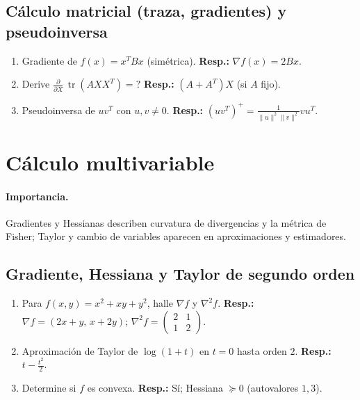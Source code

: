 	\subsection*{Cálculo matricial (traza, gradientes) y pseudoinversa}
	\begin{enumerate}
		\item Gradiente de $f(x)=x^TBx$ (simétrica). \textbf{Resp.:} $\nabla f(x)=2Bx$.
		\item Derive $\frac{\partial}{\partial X}\, \operatorname{tr}(AXX^T)=?$ \textbf{Resp.:} $(A+A^T)X$ (si $A$ fijo).
		\item Pseudoinversa de $u v^T$ con $u,v\ne0$. \textbf{Resp.:} $(uv^T)^+=\frac{1}{\|u\|^2\|v\|^2}vu^T$.
	\end{enumerate}
	
	\section{Cálculo multivariable}
	\paragraph{Importancia.} Gradientes y Hessianas describen curvatura de divergencias y la métrica de Fisher; Taylor y cambio de variables aparecen en aproximaciones y estimadores.
	
	\subsection*{Gradiente, Hessiana y Taylor de segundo orden}
	\begin{enumerate}
		\item Para $f(x,y)=x^2+xy+y^2$, halle $\nabla f$ y $\nabla^2 f$. \textbf{Resp.:} $\nabla f=(2x+y,\,x+2y)$; $\nabla^2 f=\begin{pmatrix}2&1\\1&2\end{pmatrix}$.
		\item Aproximación de Taylor de $\log(1+t)$ en $t=0$ hasta orden $2$. \textbf{Resp.:} $t-\tfrac{t^2}{2}$.
		\item Determine si $f$ es convexa. \textbf{Resp.:} Sí; Hessiana $\succeq0$ (autovalores $1,3$).
	\end{enumerate}
	
